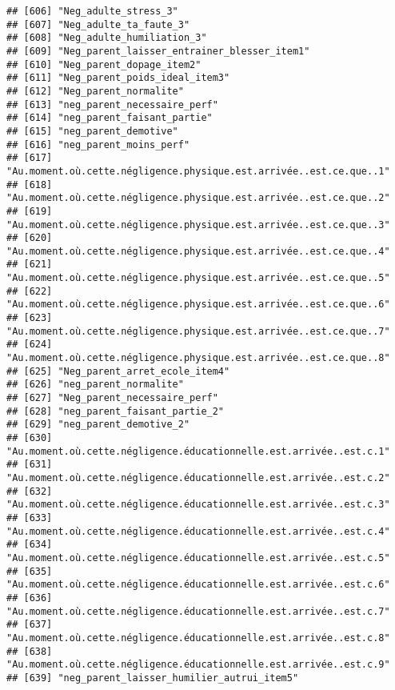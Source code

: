 \documentclass[
]{article}
\begin{document}
\begin{verbatim}
## [606] "Neg_adulte_stress_3"                                               
## [607] "Neg_adulte_ta_faute_3"                                             
## [608] "Neg_adulte_humiliation_3"                                          
## [609] "Neg_parent_laisser_entrainer_blesser_item1"                        
## [610] "Neg_parent_dopage_item2"                                           
## [611] "Neg_parent_poids_ideal_item3"                                      
## [612] "Neg_parent_normalite"                                              
## [613] "neg_parent_necessaire_perf"                                        
## [614] "neg_parent_faisant_partie"                                         
## [615] "neg_parent_demotive"                                               
## [616] "neg_parent_moins_perf"                                             
## [617] "Au.moment.où.cette.négligence.physique.est.arrivée..est.ce.que..1" 
## [618] "Au.moment.où.cette.négligence.physique.est.arrivée..est.ce.que..2" 
## [619] "Au.moment.où.cette.négligence.physique.est.arrivée..est.ce.que..3" 
## [620] "Au.moment.où.cette.négligence.physique.est.arrivée..est.ce.que..4" 
## [621] "Au.moment.où.cette.négligence.physique.est.arrivée..est.ce.que..5" 
## [622] "Au.moment.où.cette.négligence.physique.est.arrivée..est.ce.que..6" 
## [623] "Au.moment.où.cette.négligence.physique.est.arrivée..est.ce.que..7" 
## [624] "Au.moment.où.cette.négligence.physique.est.arrivée..est.ce.que..8" 
## [625] "Neg_parent_arret_ecole_item4"                                      
## [626] "neg_parent_normalite"                                              
## [627] "Neg_parent_necessaire_perf"                                        
## [628] "neg_parent_faisant_partie_2"                                       
## [629] "neg_parent_demotive_2"                                             
## [630] "Au.moment.où.cette.négligence.éducationnelle.est.arrivée..est.c.1" 
## [631] "Au.moment.où.cette.négligence.éducationnelle.est.arrivée..est.c.2" 
## [632] "Au.moment.où.cette.négligence.éducationnelle.est.arrivée..est.c.3" 
## [633] "Au.moment.où.cette.négligence.éducationnelle.est.arrivée..est.c.4" 
## [634] "Au.moment.où.cette.négligence.éducationnelle.est.arrivée..est.c.5" 
## [635] "Au.moment.où.cette.négligence.éducationnelle.est.arrivée..est.c.6" 
## [636] "Au.moment.où.cette.négligence.éducationnelle.est.arrivée..est.c.7" 
## [637] "Au.moment.où.cette.négligence.éducationnelle.est.arrivée..est.c.8" 
## [638] "Au.moment.où.cette.négligence.éducationnelle.est.arrivée..est.c.9" 
## [639] "neg_parent_laisser_humilier_autrui_item5"                          

\end{verbatim}
\end{document}
